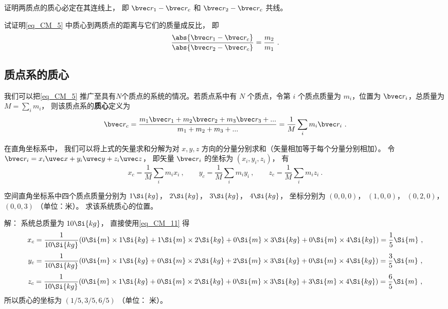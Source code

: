 \begin{exercise}{}
证明两质点的质心必定在其连线上， 即 $\bvec r_1 - \bvec r_c$ 和 $\bvec r_2 - \bvec r_c$ 共线。%
\end{exercise}

\begin{exercise}{}
试证明\autoref{eq_CM_5} 中质心到两质点的距离与它们的质量成反比， 即
\begin{equation}\label{eq_CM_6}
\frac{\abs{\bvec r_1 - \bvec r_c}}{\abs{\bvec r_2 - \bvec r_c}} = \frac{m_2}{m_1}~.
\end{equation}
\end{exercise}

\subsection{质点系的质心}
我们可以把\autoref{eq_CM_5} 推广至具有$N$个质点的系统的情况。若质点系中有 $N$ 个质点，令第 $i$ 个质点质量为 $m_i$，位置为 $\bvec r_i$，总质量为 $M = \sum\limits_i m_i$， 则该质点系的\textbf{质心}定义为
\begin{equation}\label{eq_CM_1}
\bvec r_c = \frac{m_1 \bvec r_1 + m_2 \bvec r_2 + m_3 \bvec r_3 +... }{m_1 + m_2 +m_3+...}=\frac{1}{M}\sum_i m_i \bvec r_i~.
\end{equation}

在直角坐标系中， 我们可以将上式的矢量求和分解为对 $x, y, z$ 方向的分量分别求和（矢量相加等于每个分量分别相加）。 令 $\bvec r_i = x_i \uvec x + y_i \uvec y + z_i \uvec z$， 即矢量 $\bvec r_i$ 的坐标为 $(x_i, y_i, z_i)$， 有
\begin{equation}\label{eq_CM_11}
x_c = \frac{1}{M}\sum_i m_i x_i ~,\qquad
y_c = \frac{1}{M}\sum_i m_i y_i ~,\qquad
z_c = \frac{1}{M}\sum_i m_i z_i~.
\end{equation}

\begin{example}{}
空间直角坐标系中四个质点质量分别为 $1 \Si{kg}$， $2 \Si{kg}$， $3 \Si{kg}$， $4 \Si{kg}$， 坐标分别为 $(0, 0, 0)$， $(1, 0, 0)$， $(0, 2, 0)$， $(0, 0, 3)$ （单位：米）。 求该系统质心的位置。

解： 系统总质量为 $10 \Si{kg}$， 直接使用\autoref{eq_CM_11} 得
\begin{equation}
x_c = \frac{1}{10 \Si{kg}} (0 \Si{m} \times 1 \Si{kg} + 1 \Si{m}\times 2 \Si{kg} + 0\Si{m} \times 3 \Si{kg} + 0 \Si{m}\times 4 \Si{kg}) = \frac15 \Si{m}~,
\end{equation}
\begin{equation}
y_c = \frac{1}{10 \Si{kg}} (0\Si{m}\times 1 \Si{kg} + 0\Si{m} \times 2 \Si{kg} + 2\Si{m} \times 3 \Si{kg} + 0 \Si{m}\times 4 \Si{kg}) = \frac35 \Si{m}~,
\end{equation}
\begin{equation}
z_c = \frac{1}{10 \Si{kg}} (0\Si{m}\times 1 \Si{kg} + 0\Si{m} \times 2 \Si{kg} + 0\Si{m} \times 3 \Si{kg} + 3 \Si{m}\times 4 \Si{kg}) = \frac65 \Si{m}~,
\end{equation}
所以质心的坐标为 $(1/5, 3/5, 6/5)$ （单位： 米）。
\end{example}

